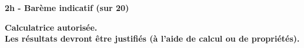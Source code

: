 \documentclass[12pt,a4paper]{article}  %
\author{}
\title{}
\date{}
\newcommand{\raisedrule}[2][0em]{\leaders\hbox{\rule[#1]{1pt}{#2}}\hfill}
\newcounter{numexo}
\newcommand{\exercice}[1]{\vskip 0.6cm\noindent\rule[+2pt]{1cm}{0.5pt}\ {\large\bf \ Exercice \thenumexo {  #1 }}\raisedrule[+2pt]{0.5pt}\null\addtocounter{numexo}{1}\par\vskip 0,4cm}
\newcommand{\va}[1]{\lvert \ #1 \ \rvert}
\newcommand{\vaf}[1]{\left\lvert \ #1\  \right\rvert}
\begin{document}
\begin{center}

\end{center}

\begin{center}\textbf{2h - Barème indicatif (sur 20)}\end{center}
\begin{center}\textbf{Calculatrice autorisée.\\Les résultats devront être justifiés (à l'aide de calcul ou de propriétés).}\end{center}

\vspace{-.3cm} 




\end{document}
